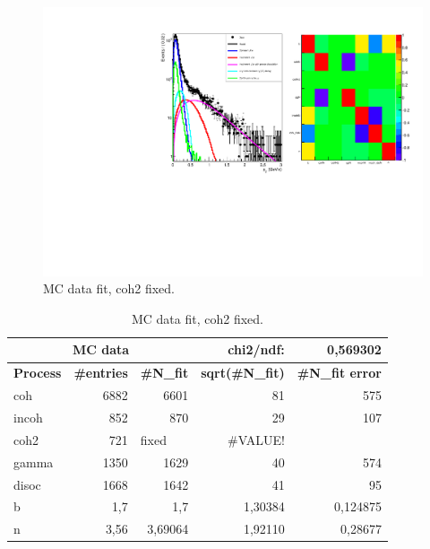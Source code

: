 \documentclass{beamer}
\begin{document}
\begin{frame}

\begin{figure}[!ht]
\centering
 {\includegraphics[width=\textwidth]{2Pt_fit.pdf}
\caption{MC data fit, coh2 fixed.} 
\label{fig:}}
\end{figure}

\end{frame}
\begin{frame}

\begin{table}[bp]
\begin{center}
\begin{tabular}{|l|r|r|r|r|}
\hline
\multicolumn{3}{|c|}{\textbf{MC data}} & chi2/ndf: & 0,569302 \\ \hline
\textbf{Process} & \multicolumn{1}{l|}{\textbf{\#entries}} & \multicolumn{1}{l|}{\textbf{\#N\_fit}} & \multicolumn{1}{l|}{\textbf{sqrt(\#N\_fit)}} & \multicolumn{1}{l|}{\textbf{\#N\_fit error}} \\ \hline
coh & 6882 & 6601 & 81 & 575 \\ \hline
incoh & 852 & 870 & 29 & 107 \\ \hline
coh2 & 721 & \multicolumn{1}{l|}{fixed} & \#VALUE! & \multicolumn{1}{l|}{} \\ \hline
gamma & 1350 & 1629 & 40 & 574 \\ \hline
disoc & 1668 & 1642 & 41 & 95 \\ \hline
b & 1,7 & 1,7 & 1,30384 & 0,124875 \\ \hline
n & 3,56 & 3,69064 & 1,92110 & 0,28677 \\ \hline
\end{tabular}
\end{center}
\caption{MC data fit, coh2 fixed.}
\label{}
\end{table}
\end{frame}
\end{document}
